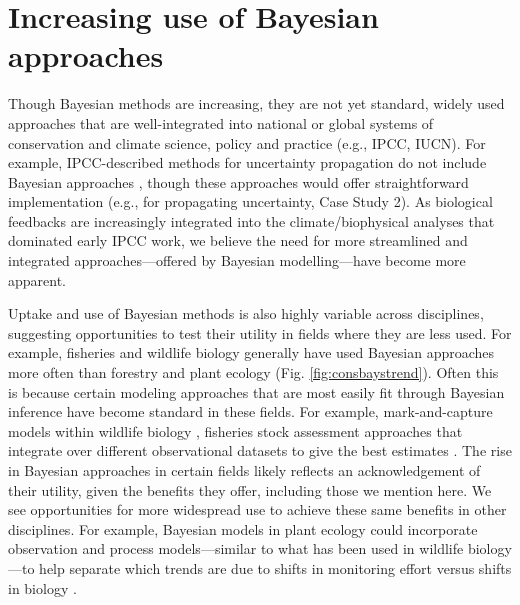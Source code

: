 \documentclass{article}
\begin{document}
\section* {Increasing use of Bayesian approaches}
\par Though Bayesian methods are increasing, they are not yet standard, widely used approaches that are well-integrated into national or global systems of conservation and climate science, policy and practice (e.g., IPCC, IUCN). For example, IPCC-described methods for uncertainty propagation do not include Bayesian approaches \citep{ipcc2007}, though these approaches would offer straightforward implementation (e.g., for propagating uncertainty, Case Study 2). As biological feedbacks are increasingly integrated into the climate/biophysical analyses that dominated early IPCC work, we believe the need for more streamlined and integrated approaches---offered by Bayesian modelling---have become more apparent. 

\par Uptake and use of Bayesian methods is also highly variable across disciplines, suggesting opportunities to test their utility in fields where they are less used. For example, fisheries and wildlife biology generally have used Bayesian approaches more often than forestry and plant ecology (Fig. \ref{fig:consbaystrend}). 
Often this is because certain modeling approaches that are most easily fit through Bayesian inference have become standard in these fields. For example, mark-and-capture models within wildlife biology \citep[e.g.,][]{royle2013spatial,calvert2009hierarchical}, fisheries stock assessment approaches that integrate over different observational datasets to give the best estimates \citep[e.g.,][]{punt1997fisheries}. The rise in Bayesian approaches in certain fields likely reflects an acknowledgement of their utility, given the benefits they offer, including those we mention here. We see opportunities for more widespread use to achieve these same benefits in other disciplines. For example, Bayesian models in plant ecology could incorporate observation and process models---similar to what has been used in wildlife biology---to help separate which trends are due to shifts in monitoring effort versus shifts in biology \citep[][]{pearse2017statistical}.
\end{document}
